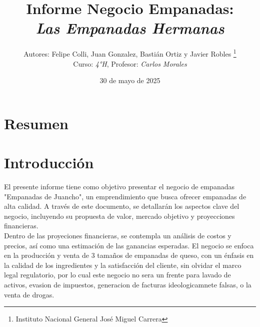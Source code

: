 \documentclass[12pt]{article}
\title{Informe Negocio Empanadas: \\
\textit{Las Empanadas Hermanas}} %
\author{Autores: Felipe Colli, Juan Gonzalez, Bastián Ortiz y Javier Robles \thanks{Instituto Nacional General José Miguel Carrera} \\
  Curso: \textit{4°H}, Profesor: \textit{Carlos Morales}} %
\date{30 de mayo de 2025} %
\begin{document}
\maketitle
\newpage

\tableofcontents
\newpage

\section{Resumen} %

\newpage



\section{Introducción} %
El presente informe tiene como objetivo presentar el negocio de empanadas "Empanadas de Juancho", un emprendimiento que busca ofrecer empanadas de alta calidad. A través de este documento, se detallarán los aspectos clave del negocio, incluyendo su propuesta de valor, mercado objetivo y proyecciones financieras. \\


Dentro de las proyeciones financieras, se contempla un análisis de costos y precios, así como una estimación de las ganancias esperadas. El negocio se enfoca en la producción y venta de 3 tamaños de empanadas de queso, con un énfasis en la calidad de los ingredientes y la satisfacción del cliente, sin olvidar el marco legal regulatorio, por lo cual este negocio no sera un frente para lavado de activos, evasion de impuestos, generacion de facturas ideologicamnete falsas, o la venta de drogas. \\ %
\end{document}
